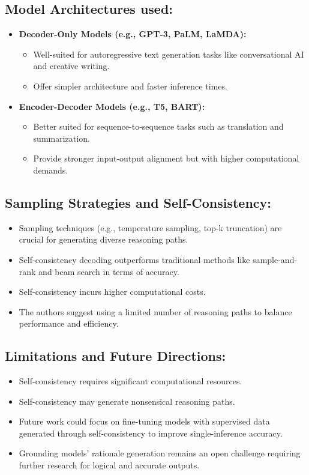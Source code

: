 \documentclass[24pt]{article}
\begin{document}
\subsection{Model Architectures used:}
    \begin{itemize}
        \item \textbf{Decoder-Only Models (e.g., GPT-3, PaLM, LaMDA):}
        \begin{itemize}
            \item Well-suited for autoregressive text generation tasks like conversational AI and creative writing.
            \item Offer simpler architecture and faster inference times.
        \end{itemize}
        \item \textbf{Encoder-Decoder Models (e.g., T5, BART):}
        \begin{itemize}
            \item Better suited for sequence-to-sequence tasks such as translation and summarization.
            \item Provide stronger input-output alignment but with higher computational demands.
        \end{itemize}
    \end{itemize}
\subsection{Sampling Strategies and Self-Consistency:}
    \begin{itemize}
        \item Sampling techniques (e.g., temperature sampling, top-k truncation) are crucial for generating diverse reasoning paths.
        \item Self-consistency decoding outperforms traditional methods like sample-and-rank and beam search in terms of accuracy.
        \item Self-consistency incurs higher computational costs.
        \item The authors suggest using a limited number of reasoning paths to balance performance and efficiency.
    \end{itemize}
\subsection{Limitations and Future Directions:}
    \begin{itemize}
        \item Self-consistency requires significant computational resources.
        \item Self-consistency may generate nonsensical reasoning paths.
        \item Future work could focus on fine-tuning models with supervised data generated through self-consistency to improve single-inference accuracy.
        \item Grounding models' rationale generation remains an open challenge requiring further research for logical and accurate outputs.
    \end{itemize}
\end{document}
